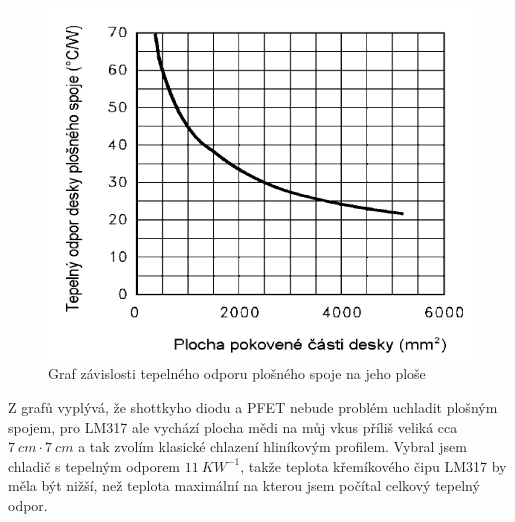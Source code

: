 \begin{figure}[H]
  \centering
  \includegraphics{img/DPS_odpor.pdf}
  \caption{Graf závislosti tepelného odporu plošného spoje na jeho ploše}
  \label{graf:1}
\end{figure}

Z grafů vyplývá, že shottkyho diodu a PFET nebude problém uchladit plošným spojem, pro LM317 ale vychází plocha mědi na můj vkus příliš veliká cca $7~cm \cdot 7~cm$ a tak zvolím klasické chlazení hliníkovým profilem. Vybral jsem chladič s tepelným odporem $11~KW^{-1}$, takže teplota křemíkového čipu LM317 by měla být nižší, než teplota maximální na kterou jsem počítal celkový tepelný odpor.